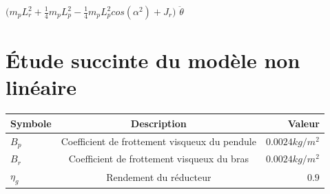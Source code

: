 \documentclass[12pt, a4paper, openany]{report}
\begin{document}
     

  $\bigg(m_{p}L_{r}^{2} + \frac{1}{4}m_{p}L_{p}^{2} - \frac{1}{4}m_{p}L_{p}^{2}cos(\alpha^{2}) + J_{r} \bigg)$ $\ddot{\theta}$

   


\section{Étude succinte du modèle non linéaire  }

                                                 




\begin{center}
\begin{tabular}{|l|c|r|}
\hline \rowcolor{lightgray} Symbole & Description &  Valeur  \\
\hline  $B_{p}$  &  Coefficient de frottement visqueux du pendule  & $0.0024 kg/m^{2}$   \\
\hline  $B_{r}$ & Coefficient de frottement visqueux du bras & $0.0024 kg/m^{2}$ \\
\hline  $\eta_{g}$  &  Rendement du réducteur  & $0.9$  \\

\hline 
\end{tabular}
\end{center}






	
\end{document}
